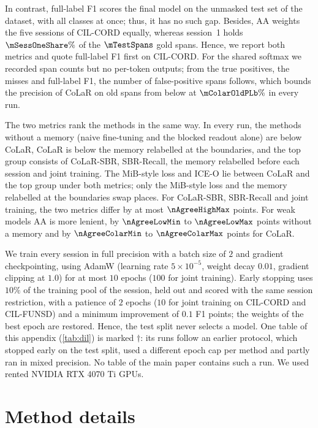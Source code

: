  In contrast, full-label F1 scores the final model on the unmasked test set of the dataset, with all classes at once; thus, it has no such gap. Besides, AA weights the five sessions of CIL-CORD equally, whereas session~1 holds $\mSessOneShare\%$ of the $\mTestSpans$ gold spans. Hence, we report both metrics and quote full-label F1 first on CIL-CORD. For the shared softmax we recorded span counts but no per-token outputs; from the true positives, the misses and full-label F1, the number of false-positive spans follows, which bounds the precision of CoLaR on old spans from below at $\mColarOldPLb\%$ in every run.

 The two metrics rank the methods in the same way. In every run, the methods without a memory (naive fine-tuning and the blocked readout alone) are below CoLaR, CoLaR is below the memory relabelled at the boundaries, and the top group consists of CoLaR-SBR, SBR-Recall, the memory relabelled before each session and joint training. The MiB-style loss and ICE-O lie between CoLaR and the top group under both metrics; only the MiB-style loss and the memory relabelled at the boundaries swap places. For CoLaR-SBR, SBR-Recall and joint training, the two metrics differ by at most $\nAgreeHighMax$ points. For weak models AA is more lenient, by $\nAgreeLowMin$ to $\nAgreeLowMax$ points without a memory and by $\nAgreeColarMin$ to $\nAgreeColarMax$ points for CoLaR.

 We train every session in full precision with a batch size of $2$ and gradient checkpointing, using AdamW (learning rate $5{\times}10^{-5}$, weight decay $0.01$, gradient clipping at $1.0$) for at most $10$ epochs ($100$ for joint training). Early stopping uses $10\%$ of the training pool of the session, held out and scored with the same session restriction, with a patience of $2$ epochs ($10$ for joint training on CIL-CORD and CIL-FUNSD) and a minimum improvement of $0.1$ F1 points; the weights of the best epoch are restored. Hence, the test split never selects a model. One table of this appendix (\cref{tab:dil}) is marked $\dagger$: its runs follow an earlier protocol, which stopped early on the test split, used a different epoch cap per method and partly ran in mixed precision. No table of the main paper contains such a run. We used rented NVIDIA RTX 4070 Ti GPUs.

\section{Method details}
\label{app:method}

